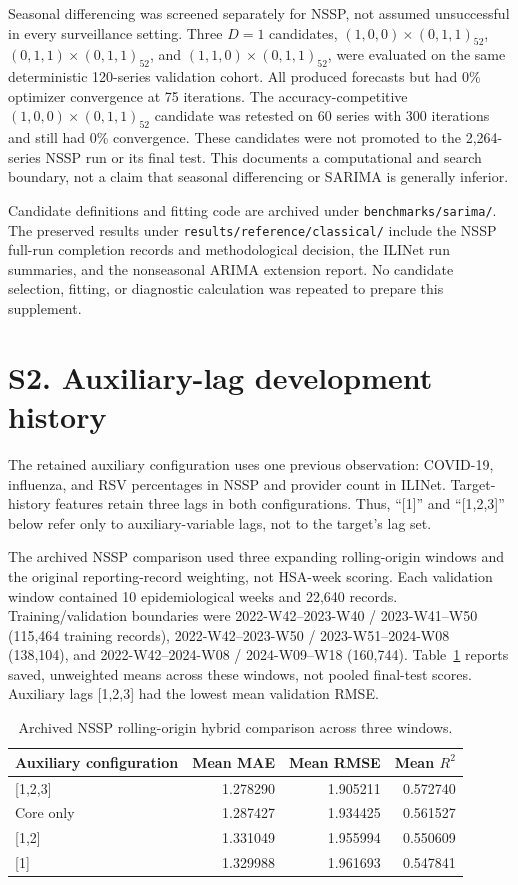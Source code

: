\documentclass[10pt,a4paper]{article}
\begin{document}
Seasonal differencing was screened separately for NSSP, not assumed unsuccessful in every surveillance setting. Three $D=1$ candidates, $(1,0,0)\times(0,1,1)_{52}$, $(0,1,1)\times(0,1,1)_{52}$, and $(1,1,0)\times(0,1,1)_{52}$, were evaluated on the same deterministic 120-series validation cohort. All produced forecasts but had 0\% optimizer convergence at 75 iterations. The accuracy-competitive $(1,0,0)\times(0,1,1)_{52}$ candidate was retested on 60 series with 300 iterations and still had 0\% convergence. These candidates were not promoted to the 2,264-series NSSP run or its final test. This documents a computational and search boundary, not a claim that seasonal differencing or SARIMA is generally inferior.

Candidate definitions and fitting code are archived under \nolinkurl{benchmarks/sarima/}. The preserved results under \nolinkurl{results/reference/classical/} include the NSSP full-run completion records and methodological decision, the ILINet run summaries, and the nonseasonal ARIMA extension report. No candidate selection, fitting, or diagnostic calculation was repeated to prepare this supplement.

\clearpage
\section*{S2. Auxiliary-lag development history}
\label{sec:S2}
The retained auxiliary configuration uses one previous observation: COVID-19, influenza, and RSV percentages in NSSP and provider count in ILINet. Target-history features retain three lags in both configurations. Thus, ``[1]'' and ``[1,2,3]'' below refer only to auxiliary-variable lags, not to the target's lag set.

The archived NSSP comparison used three expanding rolling-origin windows and the original reporting-record weighting, not HSA-week scoring. Each validation window contained 10 epidemiological weeks and 22,640 records. Training/validation boundaries were 2022-W42--2023-W40 / 2023-W41--W50 (115,464 training records), 2022-W42--2023-W50 / 2023-W51--2024-W08 (138,104), and 2022-W42--2024-W08 / 2024-W09--W18 (160,744). Table~\ref{tab:rolling} reports saved, unweighted means across these windows, not pooled final-test scores. Auxiliary lags [1,2,3] had the lowest mean validation RMSE.

\begin{table}[!ht]
\centering
\caption{Archived NSSP rolling-origin hybrid comparison across three windows.}
\label{tab:rolling}
\begin{tabular}{lrrr}
\toprule
Auxiliary configuration & Mean MAE & Mean RMSE & Mean $R^2$\\
\midrule
{[1,2,3]} & 1.278290 & 1.905211 & 0.572740\\
Core only & 1.287427 & 1.934425 & 0.561527\\
{[1,2]} & 1.331049 & 1.955994 & 0.550609\\
{[1]} & 1.329988 & 1.961693 & 0.547841\\
\bottomrule
\end{tabular}
\end{table}
\end{document}
